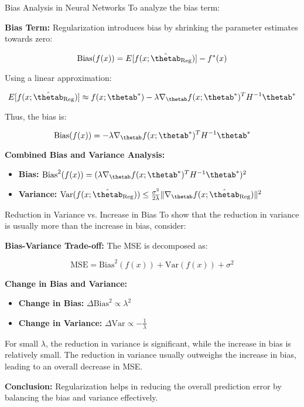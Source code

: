 \documentclass[11pt,compress,t,notes=noshow, xcolor=table]{beamer}
\begin{document}
\begin{vbframe}{Bias Analysis in Neural Networks}
To analyze the bias term:

\textbf{Bias Term:}
Regularization introduces bias by shrinking the parameter estimates towards zero:

\[
\text{Bias}(f(x)) = E[f(x; \hat{\thetab}_{\text{Reg}})] - f^*(x)
\]

Using a linear approximation:

\[
E[f(x; \hat{\thetab}_{\text{Reg}})] \approx f(x; \thetab^*) - \lambda \nabla_{\thetab} f(x; \thetab^*)^T H^{-1} \thetab^*
\]

Thus, the bias is:

\[
\text{Bias}(f(x)) = -\lambda \nabla_{\thetab} f(x; \thetab^*)^T H^{-1} \thetab^*
\]

\textbf{Combined Bias and Variance Analysis:}
\begin{itemize}
    \item \textbf{Bias:} \( \text{Bias}^2(f(x)) = (\lambda \nabla_{\thetab} f(x; \thetab^*)^T H^{-1} \thetab^*)^2 \)
    \item \textbf{Variance:} \( \text{Var}(f(x; \hat{\thetab}_{\text{Reg}})) \leq \frac{\sigma^2}{2\lambda} \|\nabla_{\thetab} f(x; \hat{\thetab}_{\text{Reg}})\|^2 \)
\end{itemize}
\end{vbframe}

\begin{vbframe}{Reduction in Variance vs. Increase in Bias}
To show that the reduction in variance is usually more than the increase in bias, consider:

\textbf{Bias-Variance Trade-off:}
The MSE is decomposed as:

\[
\text{MSE} = \text{Bias}^2(f(x)) + \text{Var}(f(x)) + \sigma^2
\]

\textbf{Change in Bias and Variance:}
\begin{itemize}
    \item \textbf{Change in Bias:} \( \Delta \text{Bias}^2 \propto \lambda^2 \)
    \item \textbf{Change in Variance:} \( \Delta \text{Var} \propto -\frac{1}{\lambda} \)
\end{itemize}

For small \(\lambda\), the reduction in variance is significant, while the increase in bias is relatively small. The reduction in variance usually outweighs the increase in bias, leading to an overall decrease in MSE.

\textbf{Conclusion:}
Regularization helps in reducing the overall prediction error by balancing the bias and variance effectively.
\end{vbframe}
\end{document}
